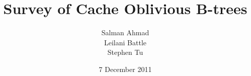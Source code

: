 \documentclass[preprint]{style}
\begin{document}
\title{Survey of Cache Oblivious B-trees}
%
%
%
%
%

%
\author{
%
%
\alignauthor
Salman Ahmad\\
\alignauthor
Leilani Battle\\
\alignauthor
Stephen Tu\\
}
\date{7 December 2011}
\end{document}
